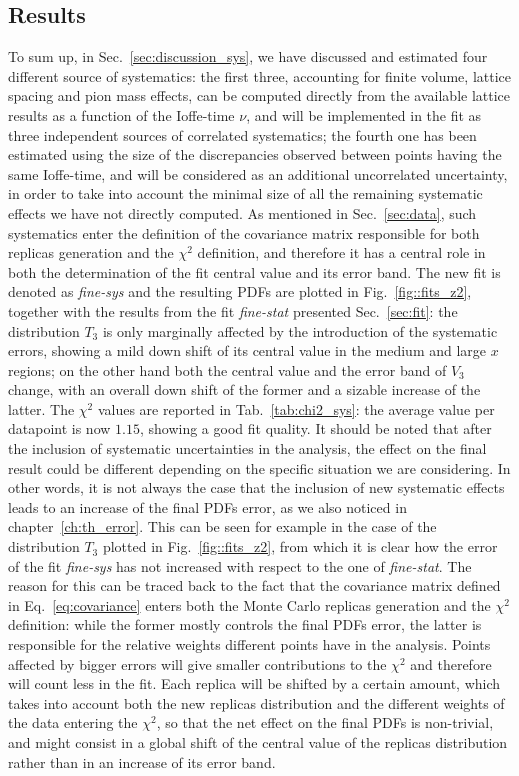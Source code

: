 \subsection{Results}
\label{sec:res}
%
To sum up, in Sec.~\ref{sec:discussion_sys}, we have discussed and estimated four different source of systematics: 
the first three, accounting for finite volume, lattice spacing and pion mass effects, can be computed directly from the available 
lattice results as a function of the Ioffe-time $\nu$, and will be implemented in the fit 
as three independent sources of correlated systematics; the fourth one has been estimated using
the size of the discrepancies observed between points having the same Ioffe-time, and will be considered
as an additional uncorrelated uncertainty, in order to take into account the minimal size of all the remaining systematic effects
we have not directly computed. 
%
As mentioned in Sec.~\ref{sec:data}, such systematics enter the definition of the covariance matrix responsible 
for both replicas generation and the $\chi^2$ definition, and therefore it has a central role in both
the determination of the fit central value and its error band.
The new fit is denoted as \textit{fine-sys} and the resulting PDFs are plotted in Fig.~\ref{fig::fits_z2}, 
together with the results from  the fit \textit{fine-stat} presented Sec.~\ref{sec:fit}:
the distribution $T_3$ is only marginally affected by the introduction of the systematic errors,
showing a mild down shift of its central value in the medium and large $x$ regions; on the other hand 
both the central value and the error band of $V_3$ change, with an overall down shift of the former and 
a sizable increase of the latter. 
The $\chi^2$ values are reported in Tab.~\ref{tab:chi2_sys}: the average value per datapoint is now $1.15$, 
showing a good fit quality.
%
It should be noted that after the inclusion of systematic uncertainties in the analysis, the effect
on the final result could be different depending on the specific situation we are considering.
In other words, it is not always the case that the inclusion of new systematic effects leads to an increase 
of the final PDFs error, as we also noticed in chapter~\ref{ch:th_error}. This can be seen for example in the case of the distribution $T_3$ plotted in Fig.~\ref{fig::fits_z2},
from which it is clear how the error of the fit \textit{fine-sys} has not increased with respect to the one of
\textit{fine-stat}. The reason for this can be traced back to the fact that the covariance matrix 
defined in Eq.~\eqref{eq:covariance} enters both the Monte Carlo replicas generation and the $\chi^2$ definition:
while the former mostly controls the final PDFs error, 
the latter is responsible for the relative weights different points have in the analysis.
Points affected by bigger errors will give smaller contributions to the $\chi^2$ and therefore 
will count less in the fit. 
Each replica will be shifted by a certain amount, 
which takes into account both the new replicas distribution and the different weights of the data entering the
$\chi^2$, so that the net effect on the final PDFs is non-trivial, and might consist in a global shift
of the central value of the replicas distribution rather than in an increase of its error band.


